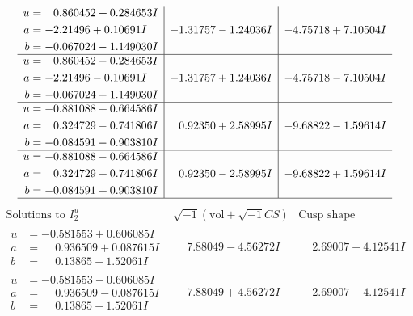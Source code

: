 \documentclass[1p]{elsarticle_modified}
\theoremstyle{definition}
\newcommand{\I}{\sqrt{-1}}
\begin{document}
$$\begin{array}{c|c|c}
\begin{aligned}
u &= \phantom{-}0.860452 + 0.284653 I \\
a &= -2.21496 + 0.10691 I \\
b &= -0.067024 - 1.149030 I\end{aligned}
 & -1.31757 - 1.24036 I & -4.75718 + 7.10504 I \\ \hline\begin{aligned}
u &= \phantom{-}0.860452 - 0.284653 I \\
a &= -2.21496 - 0.10691 I \\
b &= -0.067024 + 1.149030 I\end{aligned}
 & -1.31757 + 1.24036 I & -4.75718 - 7.10504 I \\ \hline\begin{aligned}
u &= -0.881088 + 0.664586 I \\
a &= \phantom{-}0.324729 - 0.741806 I \\
b &= -0.084591 - 0.903810 I\end{aligned}
 & \phantom{-}0.92350 + 2.58995 I & -9.68822 - 1.59614 I \\ \hline\begin{aligned}
u &= -0.881088 - 0.664586 I \\
a &= \phantom{-}0.324729 + 0.741806 I \\
b &= -0.084591 + 0.903810 I\end{aligned}
 & \phantom{-}0.92350 - 2.58995 I & -9.68822 + 1.59614 I\\
 \hline 
 \end{array}$$\newpage$$\begin{array}{c|c|c}  
\text{Solutions to }I^u_{2}& \I (\text{vol} + \sqrt{-1}CS) & \text{Cusp shape}\\
 \hline 
\begin{aligned}
u &= -0.581553 + 0.606085 I \\
a &= \phantom{-}0.936509 + 0.087615 I \\
b &= \phantom{-}0.13865 + 1.52061 I\end{aligned}
 & \phantom{-}7.88049 - 4.56272 I & \phantom{-}2.69007 + 4.12541 I \\ \hline\begin{aligned}
u &= -0.581553 - 0.606085 I \\
a &= \phantom{-}0.936509 - 0.087615 I \\
b &= \phantom{-}0.13865 - 1.52061 I\end{aligned}
 & \phantom{-}7.88049 + 4.56272 I & \phantom{-}2.69007 - 4.12541 I \\ \hline\begin{aligned}

\end{aligned}
\end{array}$$
\end{document}
